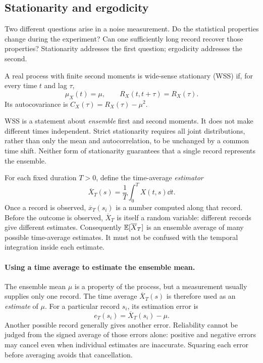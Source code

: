 \subsection{Stationarity and ergodicity}
Two different questions arise in a noise measurement. Do the statistical properties change during the experiment? Can one sufficiently long record recover those properties? Stationarity addresses the first question; ergodicity addresses the second.
\label{sec:ergodicity}
\begin{concept}[title={Wide-sense stationarity}]
A real process with finite second moments is wide-sense stationary (WSS) if, for every time $t$ and lag $\tau$,
\[
\mu_X(t)=\mu,\qquad R_X(t,t+\tau)=R_X(\tau).
\]
Its autocovariance is $C_X(\tau)=R_X(\tau)-\mu^2$.
\end{concept}
WSS is a statement about \emph{ensemble} first and second moments. It does not make different times independent. Strict stationarity requires all joint distributions, rather than only the mean and autocorrelation, to be unchanged by a common time shift. Neither form of stationarity guarantees that a single record represents the ensemble.

For each fixed duration $T>0$, define the time-average \emph{estimator}
\begin{equation}
\overline X_T(s)=\frac1T\int_0^T X(t,s)\dd t.
\label{eq:time-estimator}
\end{equation}
Once a record is observed, $\overline x_T(s_i)$ is a number computed along that record. Before the outcome is observed, $\overline X_T$ is itself a random variable: different records give different estimates. Consequently $\mathbb E[\overline X_T]$ is an ensemble average of many possible time-average estimates. It must not be confused with the temporal integration inside each estimate.
\EnsembleFigure

\paragraph{Using a time average to estimate the ensemble mean.}
The ensemble mean $\mu$ is a property of the process, but a measurement usually supplies only one record. The time average $\overline X_T(s)$ is therefore used as an \emph{estimate} of $\mu$. For a particular record $s_i$, its estimation error is
\[
e_T(s_i)=\overline X_T(s_i)-\mu.
\]
Another possible record generally gives another error. Reliability cannot be judged from the signed average of those errors alone: positive and negative errors may cancel even when individual estimates are inaccurate. Squaring each error before averaging avoids that cancellation.

